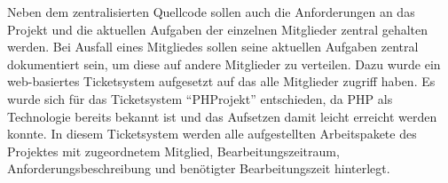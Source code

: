 
Neben dem zentralisierten Quellcode sollen auch die Anforderungen an das Projekt und die aktuellen Aufgaben der einzelnen Mitglieder zentral gehalten werden. Bei Ausfall eines Mitgliedes sollen seine aktuellen Aufgaben zentral dokumentiert sein, um diese auf andere Mitglieder zu verteilen. Dazu wurde ein web-basiertes Ticketsystem aufgesetzt auf das alle Mitglieder zugriff haben. Es wurde sich für das Ticketsystem "`PHProjekt"' entschieden, da PHP als Technologie bereits bekannt ist und das Aufsetzen damit leicht erreicht werden konnte. In diesem Ticketsystem werden alle aufgestellten Arbeitspakete des Projektes mit zugeordnetem Mitglied, Bearbeitungszeitraum, Anforderungsbeschreibung und benötigter Bearbeitungszeit hinterlegt.